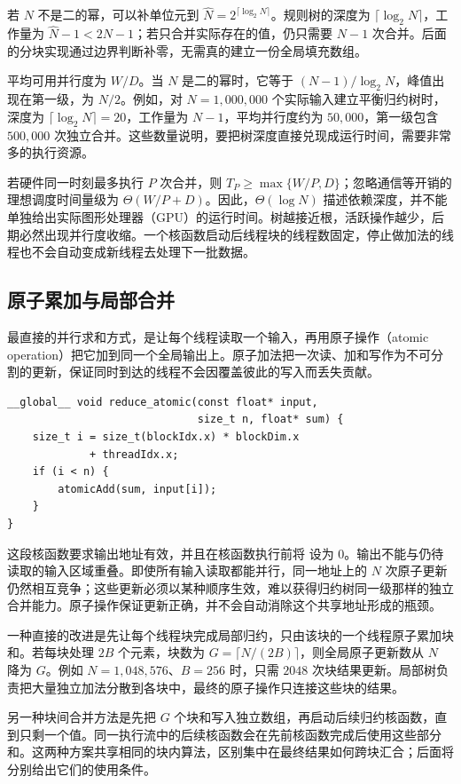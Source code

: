若 $N$ 不是二的幂，可以补单位元到 $\widehat N=2^{\lceil\log_2N\rceil}$。规则树的深度为 $\lceil\log_2N\rceil$，工作量为 $\widehat N-1<2N-1$；若只合并实际存在的值，仍只需要 $N-1$ 次合并。后面的分块实现通过边界判断补零，无需真的建立一份全局填充数组。

平均可用并行度为 $W/D$。当 $N$ 是二的幂时，它等于 $(N-1)/\log_2N$，峰值出现在第一级，为 $N/2$。例如，对 $N=1{,}000{,}000$ 个实际输入建立平衡归约树时，深度为 $\lceil\log_2N\rceil=20$，工作量为 $N-1$，平均并行度约为 $50{,}000$，第一级包含 $500{,}000$ 次独立合并。这些数量说明，要把树深度直接兑现成运行时间，需要非常多的执行资源。

若硬件同一时刻最多执行 $P$ 次合并，则 $T_P\geq\max\{W/P,D\}$；忽略通信等开销的理想调度时间量级为 $\Theta(W/P+D)$。因此，$\Theta(\log N)$ 描述依赖深度，并不能单独给出实际图形处理器（GPU）的运行时间。树越接近根，活跃操作越少，后期必然出现并行度收缩。一个核函数启动后线程块的线程数固定，停止做加法的线程也不会自动变成新线程去处理下一批数据。

\subsection{原子累加与局部合并}

最直接的并行求和方式，是让每个线程读取一个输入，再用原子操作（atomic operation）把它加到同一个全局输出上。原子加法把一次读、加和写作为不可分割的更新，保证同时到达的线程不会因覆盖彼此的写入而丢失贡献。

\noindent\begin{minipage}{\linewidth}
\begin{lstlisting}[caption={逐元素原子求和：同一个输出地址接收全部更新},label={l15:lst:code11}]
__global__ void reduce_atomic(const float* input,
                              size_t n, float* sum) {
    size_t i = size_t(blockIdx.x) * blockDim.x
             + threadIdx.x;
    if (i < n) {
        atomicAdd(sum, input[i]);
    }
}
\end{lstlisting}
\end{minipage}

这段核函数要求输出地址有效，并且在核函数执行前将 \mbox{} 设为 $0$。输出不能与仍待读取的输入区域重叠。即使所有输入读取都能并行，同一地址上的 $N$ 次原子更新仍然相互竞争；这些更新必须以某种顺序生效，难以获得归约树同一级那样的独立合并能力。原子操作保证更新正确，并不会自动消除这个共享地址形成的瓶颈。

一种直接的改进是先让每个线程块完成局部归约，只由该块的一个线程原子累加块和。若每块处理 $2B$ 个元素，块数为 $G=\lceil N/(2B)\rceil$，则全局原子更新数从 $N$ 降为 $G$。例如 $N=1{,}048{,}576$、$B=256$ 时，只需 $2048$ 次块结果更新。局部树负责把大量独立加法分散到各块中，最终的原子操作只连接这些块的结果。

另一种块间合并方法是先把 $G$ 个块和写入独立数组，再启动后续归约核函数，直到只剩一个值。同一执行流中的后续核函数会在先前核函数完成后使用这些部分和。这两种方案共享相同的块内算法，区别集中在最终结果如何跨块汇合；后面将分别给出它们的使用条件。

